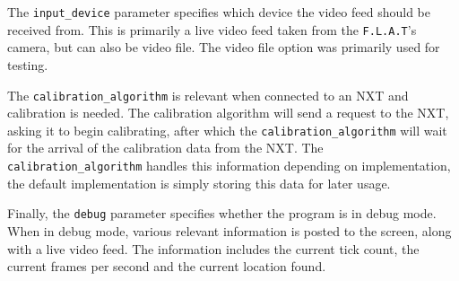 The \texttt{input\_device} parameter specifies which device the video feed should be received from. 
This is primarily a live video feed taken from the \texttt{F.L.A.T}'s camera, but can also be video file.
The video file option was primarily used for testing.

The \texttt{calibration\_algorithm} is relevant when connected to an NXT and calibration is needed. 
The calibration algorithm will send a request to the NXT, asking it to begin calibrating, after which the \texttt{calibration\_algorithm} will wait for the arrival of the calibration data from the NXT. 
The \texttt{calibration\_algorithm} handles this information depending on implementation, the default implementation is simply storing this data for later usage.

Finally, the \texttt{debug} parameter specifies whether the program is in debug mode.
When in debug mode, various relevant information is posted to the screen, along with a live video feed.
The information includes the current tick count, the current frames per second and the current location found.

